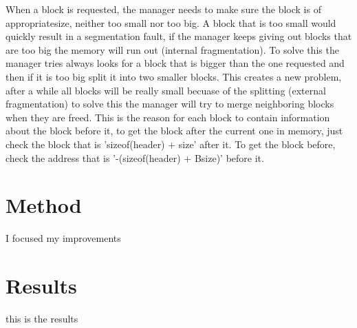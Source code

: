\documentclass[11pt]{article}
\begin{document}
When a block is requested, the manager needs to make sure the block is of appropriatesize, neither too small nor too big. A block that is too small would
quickly result in a segmentation fault, if the manager keeps giving out blocks that are too big the memory will run out (internal fragmentation). To solve this the manager tries
always looks for a block that is bigger than the one requested and then if it is too big split it into two smaller blocks. This creates a new problem,
after a while all blocks will be really small becuase of the splitting (external fragmentation) to solve this the manager will try to merge neighboring 
blocks when they are freed. This is the reason for each block to contain information about the block before it, to get the block after the current one in
memory, just check the block that is 'sizeof(header) + size' after it. To get the block before, check the address that is '-(sizeof(header) + Bsize)' before it.


\section{Method}

I focused my improvements 

\section{Results}

this is the results
\end{document}
